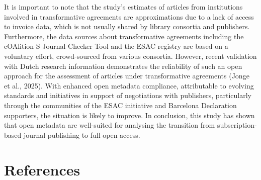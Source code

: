 \documentclass[a4paper,man,floatsintext,longtable,noextraspace,10pt]{apa6}
\begin{document}
It is important to note that the study's estimates of articles from
institutions involved in transformative agreements are approximations
due to a lack of access to invoice data, which is not usually shared by
library consortia and publishers. Furthermore, the data sources about
transformative agreements including the cOAlition S Journal Checker Tool
and the ESAC registry are based on a voluntary effort, crowd-sourced
from various consortia. However, recent validation with Dutch research
information demonstrates the reliability of such an open approach for
the assessment of articles under transformative agreements (Jonge et
al., 2025). With enhanced open metadata compliance, attributable to
evolving standards and initiatives in support of negotiations with
publishers, particularly through the communities of the ESAC initiative
and Barcelona Declaration supporters, the situation is likely to
improve. In conclusion, this study has shown that open metadata are
well-suited for analysing the transition from subscription-based journal
publishing to full open access.

\section{References}\label{references}
\end{document}
